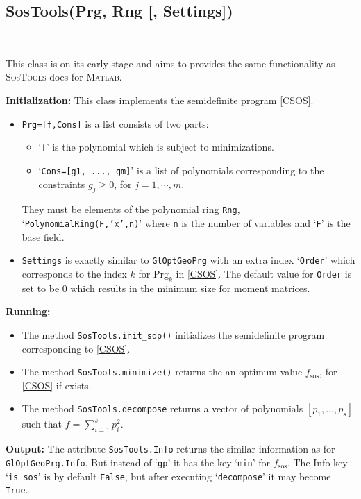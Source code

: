 \documentclass{amsart}
\theoremstyle{definition}
\newcommand{\rsos}[1]{#1_{\textrm{sos}}}
\begin{document}
\subsection{SosTools(Prg, Rng [, Settings])}~

This class is on its early stage and aims to provides the same functionality as \textsc{SosTools} does for \textsc{Matlab}.

\noindent\textbf{Initialization:}
This class implements the semidefinite program \eqref{CSOS}.
\begin{itemize}
	\item{\texttt{Prg=[f,Cons]} is a list consists of two parts:
	\begin{itemize}
		\item{`\texttt{f}' is the polynomial which is subject to minimizations.}
		\item{`\texttt{Cons=[g1, ..., gm]}' is a list of polynomials corresponding to the constraints $g_j\ge0$, for $j=1,\cdots,m$.}
	\end{itemize}
	They must be elements of the polynomial ring \texttt{Rng}, `\texttt{PolynomialRing(F,'x',n)}' where \texttt{n} is 
	the number of variables and `\texttt{F}' is the base field.}
	\item{\texttt{Settings} is exactly similar to \texttt{GlOptGeoPrg} with an extra index `\texttt{Order}' which corresponds to the index $k$ for $\textrm{Prg}_k$
	in \eqref{CSOS}.
	The default value for \texttt{Order} is set to be 0 which results in the minimum size for moment matrices.}
\end{itemize}

\noindent\textbf{Running:}
\begin{itemize}
	\item{The method \texttt{SosTools.init\_sdp()} initializes the semidefinite program corresponding to \eqref{CSOS}.}
	\item{The method \texttt{SosTools.minimize()} returns the an optimum value $\rsos{f}$, for \eqref{CSOS} if exists.}
	\item{The method \texttt{SosTools.decompose} returns a vector of polynomials $[p_1,\dots,p_s]$ such that $f=\sum_{i=1}^s p_i^2$.}
\end{itemize}

\noindent\textbf{Output:}
The attribute \texttt{SosTools.Info} returns the similar information as for \texttt{GlOptGeoPrg.Info}. But instead of `\texttt{gp}' it has the key `\texttt{min}'
for $\rsos{f}$. The Info key `\texttt{is sos}' is by default \texttt{False}, but after executing `\texttt{decompose}' it may become \texttt{True}.
\end{document}
